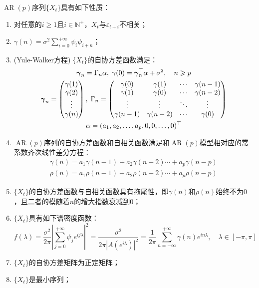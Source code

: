 \begin{property}\label{prop:ARp}
	$\operatorname{AR}(p)$序列$\{X_t\}$具有如下性质：
	\begin{enumerate}
		\item 对任意的$i\geqslant1$且$i\in\mathbb{N}^+$，$X_t$与$\varepsilon_{t+i}$不相关；
		\item $\gamma(n)=\sigma^2\sum\limits_{i=0}^{+\infty}\psi_i\psi_{i+n}$；
		\item (Yule-Walker方程)$\;\{X_t\}$的自协方差函数满足：
		\begin{gather*}
			\boldsymbol{\gamma}_n=\Gamma_n\alpha,\;
			\gamma(0)=\boldsymbol{\gamma}_n^{\top}\alpha+\sigma^2,\quad n\geqslant p \\
			\boldsymbol{\gamma}_n=
			\begin{pmatrix}
				\gamma(1) \\
				\gamma(2) \\
				\vdots \\
				\gamma(n)
			\end{pmatrix},\;
			\Gamma_n=
			\begin{pmatrix}
				\gamma(0) & \gamma(1) & \cdots & \gamma(n-1) \\
				\gamma(1) & \gamma(0) & \cdots & \gamma(n-2) \\
				\vdots & \vdots & \ddots & \vdots \\
				\gamma(n-1) & \gamma(n-2) & \cdots & \gamma(0) \\
			\end{pmatrix} \\
			\alpha=(a_1, a_2, \dots, a_{p},0,0,\dots,0)^{\top}
		\end{gather*}
		\item $\operatorname{AR}(p)$序列的自协方差函数和自相关函数满足和$\operatorname{AR}(p)$模型相对应的常系数齐次线性差分方程：
		\begin{gather*}
			\gamma(n)=a_1\gamma(n-1)+a_2\gamma(n-2)\cdots+a_p\gamma(n-p) \\
			\rho(n)=a_1\rho(n-1)+a_2\rho(n-2)\cdots+a_p\rho(n-p)
		\end{gather*}
		\item $\{X_t\}$的自协方差函数与自相关函数具有拖尾性，即$\gamma(n)$和$\rho(n)$始终不为$0$，且二者的模随着$n$的增大指数衰减到$0$；
		\item $\{X_t\}$具有如下谱密度函数：
		\begin{equation*}
			f(\lambda)=\frac{\sigma^2}{2\pi}\left|\sum_{j=0}^{+\infty}\psi_je^{ij\lambda}\right|^2=\frac{\sigma^2}{2\pi|A(e^{i\lambda})|^2}=\frac{1}{2\pi}\sum_{n=-\infty}^{+\infty}\gamma(n)e^{in\lambda},\quad\lambda\in[-\pi,\pi]
		\end{equation*}
		\item $\{X_t\}$的自协方差矩阵为正定矩阵；
		\item $\{X_t\}$是最小序列；
	\end{enumerate}
\end{property}
